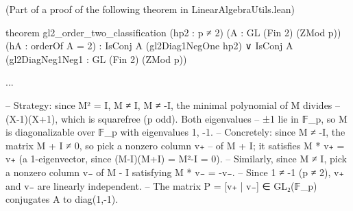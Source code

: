 (Part of a proof of the following theorem in LinearAlgebraUtils.lean)

theorem gl2_order_two_classification (hp2 : p ≠ 2) (A : GL (Fin 2) (ZMod p))
    (hA : orderOf A = 2) :
    IsConj A (gl2Diag1NegOne hp2) ∨ IsConj A (gl2DiagNeg1Neg1 : GL (Fin 2) (ZMod p))

...

-- Strategy: since M² = I, M ≠ I, M ≠ -I, the minimal polynomial of M divides
    -- (X-1)(X+1), which is squarefree (p odd). Both eigenvalues
    -- ±1 lie in 𝔽_p, so M is diagonalizable over 𝔽_p with eigenvalues {1, -1}.
    -- Concretely: since M ≠ -I, the matrix M + I ≠ 0, so pick a nonzero column v₊
    -- of M + I; it satisfies M * v₊ = v₊ (a 1-eigenvector, since (M-I)(M+I) = M²-I = 0).
    -- Similarly, since M ≠ I, pick a nonzero column v₋ of M - I satisfying M * v₋ = -v₋.
    -- Since 1 ≠ -1 (p ≠ 2), v₊ and v₋ are linearly independent.
    -- The matrix P = [v₊ | v₋] ∈ GL₂(𝔽_p) conjugates A to diag(1,-1).